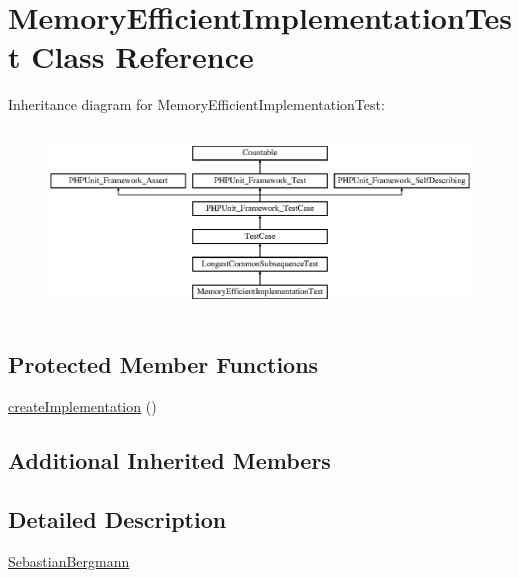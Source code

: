 \hypertarget{class_sebastian_bergmann_1_1_diff_1_1_l_c_s_1_1_memory_efficient_implementation_test}{}\section{Memory\+Efficient\+Implementation\+Test Class Reference}
\label{class_sebastian_bergmann_1_1_diff_1_1_l_c_s_1_1_memory_efficient_implementation_test}
Inheritance diagram for Memory\+Efficient\+Implementation\+Test\+:\begin{figure}[H]
\begin{center}
\leavevmode
\includegraphics[height=4.955752cm]{class_sebastian_bergmann_1_1_diff_1_1_l_c_s_1_1_memory_efficient_implementation_test}
\end{center}
\end{figure}
\subsection*{Protected Member Functions}
\begin{DoxyCompactItemize}
\item 
\mbox{\hyperlink{class_sebastian_bergmann_1_1_diff_1_1_l_c_s_1_1_memory_efficient_implementation_test_a18a73c48948433fffa13061d1e7a35f1}{create\+Implementation}} ()
\end{DoxyCompactItemize}
\subsection*{Additional Inherited Members}


\subsection{Detailed Description}
\mbox{\hyperlink{namespace_sebastian_bergmann}{Sebastian\+Bergmann}} 


